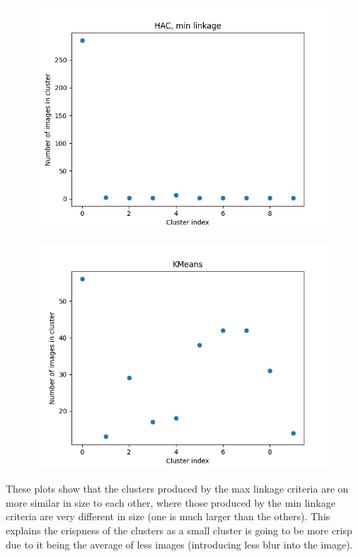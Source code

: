 \documentclass[submit]{harvardml}
\begin{document}
\begin{enumerate}
\newpage
\begin{figure}[h]
\includegraphics[width=\linewidth]{part5hacmin}
\end{figure}

\newpage
\begin{figure}[h]
\includegraphics[width=\linewidth]{part5kmeansplot}
\end{figure}

These plots show that the clusters produced by the max linkage criteria are on more
similar in size to each other, where those produced by the min linkage criteria 
are very different in size (one is much larger than the others). This explains the
crispness of the clusters as a small cluster is going to be more crisp due to it 
being the average of less images (introducing less blur into the image).


\end{enumerate}
\end{document}
